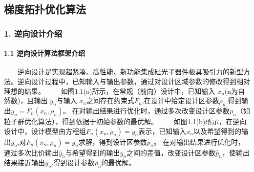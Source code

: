 \documentclass[letterpaper,10pt,english]{sphinxmanual}
\begin{document}
\sphinxstepscope


\subsection{梯度拓扑优化算法}
\label{\detokenize{_u7b80_u4ecb/_u6838_u5fc3_u8bbe_u8ba1_u4f18_u5316_u7b97_u6cd5/_u68af_u5ea6_u62d3_u6251_u4f18_u5316_u6a21_u5757/_u68af_u5ea6_u62d3_u6251_u4f18_u5316_u7b97_u6cd5:id1}}\label{\detokenize{_u7b80_u4ecb/_u6838_u5fc3_u8bbe_u8ba1_u4f18_u5316_u7b97_u6cd5/_u68af_u5ea6_u62d3_u6251_u4f18_u5316_u6a21_u5757/_u68af_u5ea6_u62d3_u6251_u4f18_u5316_u7b97_u6cd5::doc}}

\subsubsection{1. 逆向设计介绍}
\label{\detokenize{_u7b80_u4ecb/_u6838_u5fc3_u8bbe_u8ba1_u4f18_u5316_u7b97_u6cd5/_u68af_u5ea6_u62d3_u6251_u4f18_u5316_u6a21_u5757/_u68af_u5ea6_u62d3_u6251_u4f18_u5316_u7b97_u6cd5:id2}}

\paragraph{1.1 逆向设计算法框架介绍}
\label{\detokenize{_u7b80_u4ecb/_u6838_u5fc3_u8bbe_u8ba1_u4f18_u5316_u7b97_u6cd5/_u68af_u5ea6_u62d3_u6251_u4f18_u5316_u6a21_u5757/_u68af_u5ea6_u62d3_u6251_u4f18_u5316_u7b97_u6cd5:id3}}
\sphinxAtStartPar
  逆向设计是实现超紧凑、高性能、新功能集成硅光子器件极具吸引力的新型方法。逆向设计过程中，已知输入与输出参数，通过对设计区域参数的修改得到相对理想的结果。
  如图1.1(a)所示，在常规（前向）设计中，已知输入 \(x_n\)(n为自然数)，且输出 \(y_n\)与输入 \(x_n\)之间存在约束式\(F_n\),在设计中给定设计区参数\(ρ_n\),得到输出\(y_n=F_n(x_n,ρ_n)\)。
在对输出结果进行优化时，通过多次改变设计区参数\(ρ_n\)（如粒子群优化算法），得到依据于初始参数的最优解。
  如图1.1(b)所示，在逆向设计中，设计模型由方程组\(F_n(x_n,ρ_n)=y_n\)表示，已知输入\(x_n\)以及希望得到的输出\(y_n\),对\(F_n(x_n,ρ_n)=y_n\)求解，得到设计区参数\(\hat{p}_n\)。
在对输出结果进行优化时，通过多次比价输出\(\hat{y}_n\)与希望得到的输出\(y_n\)之间的差值，改变设计区参数\(\hat{p}_n\)，使输出结果接近输出\(y_n\),得到设计参数\(ρ_n\)的最优解。


\sphinxAtStartPar
{}
\end{document}
